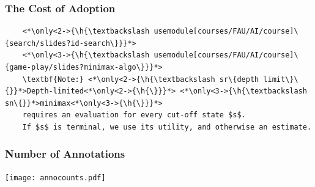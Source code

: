 \documentclass[aspectratio=169]{beamer}
\begin{document}
\begin{frame}[fragile]
    \frametitle{The Cost of Adoption}

    \def\h#1{\colorbox{yellow!50!red!70}{#1}}
    \begin{lstlisting}
    <*\only<2->{\h{\textbackslash usemodule[courses/FAU/AI/course]\{search/slides?id-search\}}}*>
    <*\only<3->{\h{\textbackslash usemodule[courses/FAU/AI/course]\{game-play/slides?minimax-algo\}}}*>
    \textbf{Note:} <*\only<2->{\h{\textbackslash sr\{depth limit\}\{}}*>Depth-limited<*\only<2->{\h{\}}}*> <*\only<3->{\h{\textbackslash sn\{}}*>minimax<*\only<3->{\h{\}}}*>
    requires an evaluation for every cut-off state $s$.
    If $s$ is terminal, we use its utility, and otherwise an estimate.
    \end{lstlisting}

\end{frame}

\begin{frame}
    \frametitle{Number of Annotations}
    \centering
    \texttt{[image: annocounts.pdf]}
\end{frame}
\end{document}
